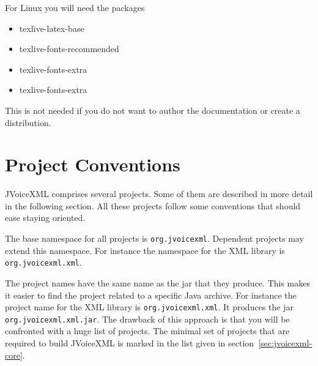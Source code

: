 \documentclass[11pt,a4paper]{article}
\begin{document}
For Linux you will need the packages
\begin{itemize}
  \item texlive-latex-base
  \item texlive-fonts-recommended
  \item texlive-fonts-extra
  \item texlive-fonts-extra
\end{itemize}
This is not needed if you do not want to author the documentation or create a
distribution.

\section{Project Conventions}

JVoiceXML comprises several projects. Some of them are described in more
detail in the following section. All these projects follow some conventions
that should ease staying oriented.

The base namespace for all projects is \lstinline{org.jvoicexml}. Dependent 
projects may extend this namespace. For instance the namespace for the
XML library is \lstinline{org.jvoicexml.xml}.

The project names have the same name as the jar that they produce. This
makes it easier to find the project related to a specific Java archive.
For instance the project name for the XML library is
\lstinline{org.jvoicexml.xml}. It produces the jar
\texttt{org.jvoicexml.xml.jar}.
The drawback of this approach is that you will be confronted 
with a huge list of projects. The minimal set of projects
that are required to build JVoiceXML is marked in the list
given in section~\ref{sec:jvoicexml-core}.
\end{document}
